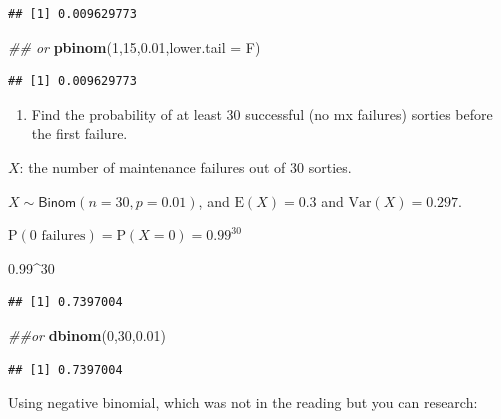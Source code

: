 \documentclass[
]{book}
\newenvironment{Shaded}{\begin{snugshade}}{\end{snugshade}}
\newcommand{\CommentTok}[1]{\textcolor[rgb]{0.56,0.35,0.01}{\textit{#1}}}
\newcommand{\DataTypeTok}[1]{\textcolor[rgb]{0.13,0.29,0.53}{#1}}
\newcommand{\DecValTok}[1]{\textcolor[rgb]{0.00,0.00,0.81}{#1}}
\newcommand{\FloatTok}[1]{\textcolor[rgb]{0.00,0.00,0.81}{#1}}
\newcommand{\KeywordTok}[1]{\textcolor[rgb]{0.13,0.29,0.53}{\textbf{#1}}}
\newcommand{\NormalTok}[1]{#1}
\newcommand{\OperatorTok}[1]{\textcolor[rgb]{0.81,0.36,0.00}{\textbf{#1}}}
\providecommand{\tightlist}{%
  \setlength{\itemsep}{0pt}\setlength{\parskip}{0pt}}
\begin{document}
\begin{verbatim}
## [1] 0.009629773
\end{verbatim}

\begin{Shaded}
\begin{Highlighting}[]
\CommentTok{## or }
\KeywordTok{pbinom}\NormalTok{(}\DecValTok{1}\NormalTok{,}\DecValTok{15}\NormalTok{,}\FloatTok{0.01}\NormalTok{,}\DataTypeTok{lower.tail =}\NormalTok{ F)}
\end{Highlighting}
\end{Shaded}

\begin{verbatim}
## [1] 0.009629773
\end{verbatim}

\begin{enumerate}
\def\labelenumi{\alph{enumi}.}
\setcounter{enumi}{2}
\tightlist
\item
  Find the probability of at least 30 successful (no mx failures) sorties before the first failure.
\end{enumerate}

\(X\): the number of maintenance failures out of 30 sorties.

\(X\sim \textsf{Binom}(n=30,p=0.01)\), and \(\mbox{E}(X)=0.3\) and \(\mbox{Var}(X)=0.297\).

\(\mbox{P}(\mbox{0 failures})=\mbox{P}(X=0)=0.99^{30}\)

\begin{Shaded}
\begin{Highlighting}[]
\FloatTok{0.99}\OperatorTok{^}\DecValTok{30}
\end{Highlighting}
\end{Shaded}

\begin{verbatim}
## [1] 0.7397004
\end{verbatim}

\begin{Shaded}
\begin{Highlighting}[]
\CommentTok{##or }
\KeywordTok{dbinom}\NormalTok{(}\DecValTok{0}\NormalTok{,}\DecValTok{30}\NormalTok{,}\FloatTok{0.01}\NormalTok{)}
\end{Highlighting}
\end{Shaded}

\begin{verbatim}
## [1] 0.7397004
\end{verbatim}

Using negative binomial, which was not in the reading but you can research:
\end{document}

